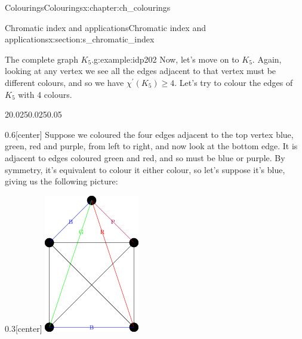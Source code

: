 \documentclass[oneside,10pt,]{book}
\numberwithin{equation}{section}
\begin{document}
\begin{chapterptx}{Colourings}{}{Colourings}{}{}{x:chapter:ch_colourings}
\begin{sectionptx}{Chromatic index and applications}{}{Chromatic index and applications}{}{}{x:section:s_chromatic_index}
\begin{example}{The complete graph \(K_5\).}{g:example:idp202}
Now, let's move on to \(K_5\).  Again, looking at any vertex we see all the edges adjacent to that vertex must be different colours, and so we have \(\chi^\prime(K_5)\geq 4\).   Let's try to colour the edges of \(K_5\) with 4 colours.%
\begin{sidebyside}{2}{0.025}{0.025}{0.05}%
\begin{sbspanel}{0.6}[center]%
Suppose we coloured the four edges adjacent to the top vertex blue, green, red and purple, from left to right, and now look at the bottom edge.  It is adjacent to edges coloured green and red, and so must be blue or purple.  By symmetry, it's equivalent to colour it either colour, so let's suppose it's blue, giving us the following picture:%
\end{sbspanel}%
\begin{sbspanel}{0.3}[center]%
\includegraphics[width=\linewidth]{images/K5EdgeColouring1.png}

\end{sbspanel}
\end{sidebyside}
\end{example}
\end{sectionptx}
\end{chapterptx}
\end{document}
